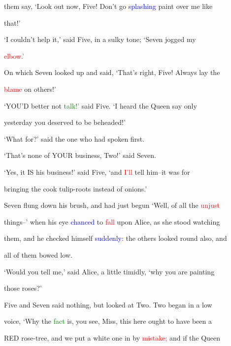  them say, ‘Look out now, Five! Don’t go \textcolor{blue}{splashing} paint over me like

 that!’



 ‘I couldn’t help it,’ said Five, in a sulky tone; ‘Seven jogged my

 \textcolor{red}{elbow.’}



 On which Seven looked up and said, ‘That’s right, Five! Always lay the

 \textcolor{red}{blame} on others!’



 ‘YOU’D better not \textcolor{green}{talk!’} said Five. ‘I heard the Queen say only

 yesterday you \textcolor{BurntOrange}{deserved} to be beheaded!’



 ‘What for?’ said the one who had spoken first.



 ‘That’s none of YOUR business, Two!’ said Seven.



 ‘Yes, it IS his business!’ said Five, ‘and \textcolor{red}{I’ll} tell him--it was for

 bringing the cook tulip-roots instead of onions.’



 Seven flung down his brush, and had just begun ‘Well, of all the \textcolor{red}{unjust}

 things--’ when his eye \textcolor{blue}{chanced} to \textcolor{red}{fall} upon Alice, as she stood \textcolor{BurntOrange}{watching}

 them, and he checked himself \textcolor{blue}{suddenly:} the others looked round also, and

 all of them bowed low.



 ‘Would you tell me,’ said Alice, a little timidly, ‘why you are painting

 those roses?’



 Five and Seven said nothing, but looked at Two. Two began in a low

 voice, ‘Why the \textcolor{green}{fact} is, you see, Miss, this here ought to have been a

 RED rose-tree, and we put a \textcolor{BurntOrange}{white} one in by \textcolor{red}{mistake;} and if the Queen

